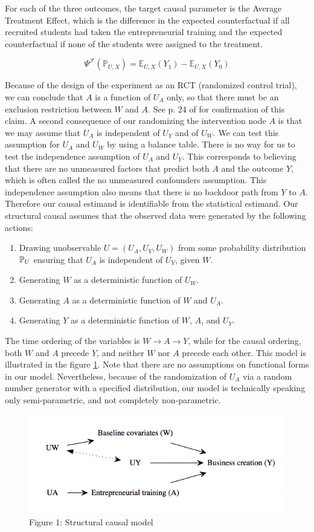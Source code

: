 For each of the three outcomes, the target causal parameter is the Average Treatment Effect, which is the difference in the expected counterfactual if all recruited students had taken the entrepreneurial training and the expected counterfactual if none of the students were assigned to the treatment.

\[ \Psi^{\mathcal{F}}(\mathbb{P}_{U,X}) = \mathbb{E}_{U,X}(Y_1) - \mathbb{E}_{U,X}(Y_0)  \]

Because of the design of the experiment as an RCT (randomized control trial), we can conclude that $A$ is a function of $U_A$ only, so that there must be an exclusion restriction between $W$ and $A$. See p. 24 of \cite{tlb} for confirmation of this claim. A second consequence of our randomizing the intervention node $A$ is that we may assume that $U_A$ is independent of $U_Y$ and of $U_W$. We can test this assumption for $U_A$ and $U_W$ by using a balance table. There is no way for us to test the independence assumption of $U_A$ and $U_Y$. This corresponds to believing that there are no unmeasured factors that predict both $A$ and the outcome $Y$, which is often called the no unmeasured confounders assumption. This independence assumption also means that there is no backdoor path from $Y$ to $A$. Therefore our causal estimand is identifiable from the statistical estimand. Our structural causal assumes that the observed data were generated by the following actions: \\

\begin{enumerate}
\item Drawing unobservable $U=(U_A, U_Y, U_W)$ from some probability distribution $\mathbb{P}_U$ ensuring that $U_A$ is independent of $U_Y$, given $W$.
\item Generating $W$ as a deterministic function of $U_W$.
\item Generating $A$ as a deterministic function of $W$ and $U_A$.
\item Generating $Y$ as a deterministic function of $W$, $A$, and $U_Y$.
\end{enumerate} 

The time ordering of the variables is $W \to A \to Y$, while for the causal ordering, both $W$ and $A$ precede $Y$, and neither $W$ nor $A$ precede each other. This model is illustrated in the figure \ref{fig:DAG}. Note that there are no assumptions on functional forms in our model. Nevertheless, because of the randomization of $U_A$ via a random number generator with a specified distribution, our model is technically speaking only semi-parametric, and not completely non-parametric.\\

\begin{figure}[h]
  \centering
  \includegraphics{../../DAG_Uganda.png}
  \caption{Figure 1: Structural causal model\label{fig:DAG}}
\end{figure}


